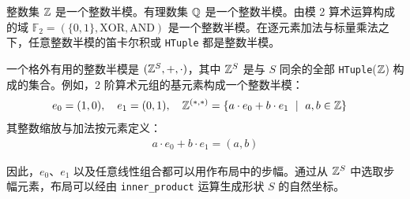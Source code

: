 整数集 $\mathbb{Z}$ 是一个整数半模。有理数集 $\mathbb{Q}$ 是一个整数半模。由模 2 算术运算构成的域 $\mathbb{F}_2 = (\{0,1\},\text{XOR},\text{AND})$ 是一个整数半模。在逐元素加法与标量乘法之下，任意整数半模的笛卡尔积或 {\tt HTuple} 都是整数半模。

一个格外有用的整数半模是 $(\mathbb{Z}^S,+,\cdot)$，其中 $\mathbb{Z}^S$ 是与 $S$ 同余的全部 {\tt HTuple}($\mathbb{Z}$) 构成的集合。例如，2 阶算术元组的基元素构成一个整数半模：
\begin{align*}
e_0 = (1,0), \quad e_1 = (0,1), \quad \mathbb{Z}^{(\ast,\ast)} &= \{a \cdot e_0 + b \cdot e_1 \ \mid \ a, b \in \mathbb{Z}\}
\end{align*}
其整数缩放与加法按元素定义：
{\small
\begin{align*}
a \cdot e_0 + b \cdot e_1 = (a, b)
\end{align*}}

因此，$e_0$、$e_1$ 以及任意线性组合都可以用作布局中的步幅。通过从 $\mathbb{Z}^S$ 中选取步幅元素，布局可以经由 \texttt{inner\allowbreak\_product} 运算生成形状 $S$ 的自然坐标。
